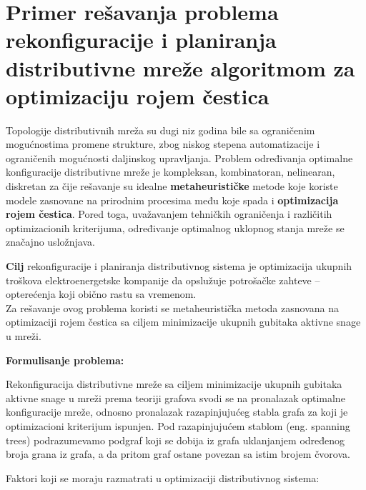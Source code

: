 \documentclass[a4paper]{article}
\begin{document}
\vspace{15mm}
\section{Primer rešavanja problema rekonfiguracije i planiranja distributivne mreže algoritmom za optimizaciju rojem čestica}

\vspace{5mm} 


Topologije distributivnih mreža su dugi niz godina bile sa ograničenim mogućnostima promene strukture, zbog niskog stepena automatizacije i ograničenih mogućnosti daljinskog upravljanja. 
Problem određivanja optimalne konfiguracije distributivne mreže je kompleksan, kombinatoran, nelinearan, diskretan za čije rešavanje su idealne \textbf{metaheurističke} metode koje koriste modele zasnovane na prirodnim procesima među koje spada i \textbf{optimizacija rojem čestica}. Pored toga, uvažavanjem tehničkih ograničenja i različitih optimizacionih kriterijuma, određivanje optimalnog uklopnog stanja mreže se značajno usložnjava.

\textbf{Cilj} rekonfiguracije i planiranja distributivnog sistema je optimizacija ukupnih troškova elektroenergetske kompanije da opslužuje potrošačke zahteve – opterećenja koji obično rastu sa vremenom.\\

Za rešavanje ovog problema koristi se metaheuristička metoda zasnovana na optimizaciji rojem čestica sa ciljem minimizacije ukupnih gubitaka aktivne snage u mreži. 

\vspace{5mm} 

\textbf{Formulisanje problema:} 

\vspace{5mm} 

Rekonfiguracija distributivne mreže sa ciljem minimizacije ukupnih gubitaka aktivne snage u mreži prema teoriji grafova svodi se na pronalazak optimalne konfiguracije mreže, odnosno pronalazak razapinjujućeg stabla grafa za koji je optimizacioni kriterijum ispunjen. Pod razapinjujućem stablom (eng. spanning trees) podrazumevamo podgraf koji se dobija iz grafa uklanjanjem određenog broja  grana iz grafa, a da pritom graf ostane povezan sa istim brojem čvorova. 

\vspace{5mm} 

Faktori koji se moraju razmatrati  u optimizaciji distributivnog sistema:
\end{document}
